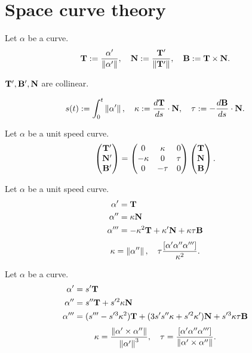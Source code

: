 \documentclass[11pt]{article}
\let\realsection\section
\renewcommand\section{\newpage\realsection}
\begin{document}
\section{Space curve theory}
\begin{defn}
Let $\alpha$ be a curve.
\[\mathbf{T}:=\frac{\alpha'}{\left\lVert\alpha'\right\rVert},\quad\mathbf{N}:=\frac{\mathbf{T}'}{\left\lVert\mathbf{T}'\right\rVert},\quad\mathbf{B}:=\mathbf{T}\times\mathbf{N}.\]
\end{defn}
\begin{prop}
$\mathbf{T}',\mathbf{B}',\mathbf{N}$ are collinear.
\end{prop}

\begin{defn}
\[s(t):=\int_0^t\norm{\alpha'},\quad\kappa:=\dd{\bT}{s}\cdot\bN,\quad\tau:=-\dd{\bB}{s}\cdot\bN.\]
\end{defn}



\begin{thm}
Let $\alpha$ be a unit speed curve.
\[\begin{pmatrix}\mathbf{T}'\\\mathbf{N}'\\\mathbf{B}'\end{pmatrix}=\begin{pmatrix}0&\kappa&0\\-\kappa&0&\tau\\0&-\tau&0\end{pmatrix}\begin{pmatrix}\mathbf{T}\\\mathbf{N}\\\mathbf{B}\end{pmatrix}.\]
\end{thm}
\begin{thm}
Let $\alpha$ be a unit speed curve.
\begin{align*}
\alpha'&=\mathbf{T}\\
\alpha''&=\kappa\mathbf{N}\\
\alpha'''&=-\kappa^2\mathbf{T}+\kappa'\mathbf{N}+\kappa\tau\mathbf{B}
\end{align*}
\[\kappa=\left\lVert\alpha''\right\rVert,\quad\tau\frac{[\alpha'\alpha''\alpha''']}{\kappa^2}.\]
\end{thm}

\begin{thm}
Let $\alpha$ be a curve.
\begin{align*}
\alpha'&=s'\mathbf{T}\\
\alpha''&=s''\mathbf{T}+s'^2\kappa\mathbf{N}\\
\alpha'''&=(s'''-s'^3\kappa^2)\mathbf{T}+(3s's''\kappa+s'^2\kappa')\mathbf{N}+s'^3\kappa\tau\mathbf{B}
\end{align*}
\[\kappa=\frac{\left\lVert\alpha'\times\alpha''\right\rVert}{\left\lVert\alpha'\right\rVert^3},\quad\tau=\frac{[\alpha'\alpha''\alpha''']}{\left\lVert\alpha'\times\alpha''\right\rVert}.\]
\end{thm}
\end{document}
